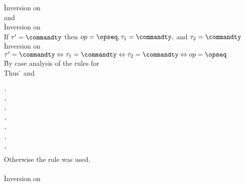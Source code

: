 \begin{description}
\begin{tabbing}
      \` Inversion on \presbinopunwind \\
     and
     \\
      \` Inversion on  \\
    If $\tau' = \commandty$ then $op = \opseq, \tau_1 = \commandty, $ and $\tau_2 = \commandty$ \\
      \` Inversion on  \\
    $\tau' = \commandty \Leftrightarrow \tau_1 = \commandty \Leftrightarrow \tau_2 = \commandty \Leftrightarrow op = \opseq$ \\
      \` By case analysis of the rules for  \\
    \pushtabs
    Thus \=  and \+ \\
             \- \\
    \poptabs
      \`  \\
      \`  \\
      \`  \\
      \`  \\
      \`  \\
      \`  \\
      \`  \- \\
  Otherwise the {\tt {}} rule was used. \+ \\
     \\
      \` Inversion on \presbinopunwind{} \\

\end{tabbing}
\end{description}
